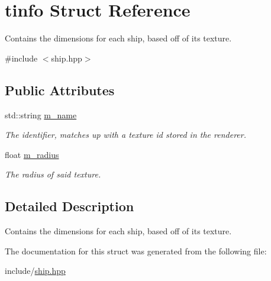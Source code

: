 \hypertarget{structtinfo}{\section{tinfo Struct Reference}
\label{structtinfo}
}


Contains the dimensions for each ship, based off of its texture.  




{\ttfamily \#include $<$ship.\-hpp$>$}

\subsection*{Public Attributes}
\begin{DoxyCompactItemize}
\item 
\hypertarget{structtinfo_a739a47e942419a16cd995d835401c202}{std\-::string \hyperlink{structtinfo_a739a47e942419a16cd995d835401c202}{m\-\_\-name}}\label{structtinfo_a739a47e942419a16cd995d835401c202}

\begin{DoxyCompactList}\small\item\em The identifier, matches up with a texture id stored in the renderer. \end{DoxyCompactList}\item 
\hypertarget{structtinfo_a98fc4ccb9b63c90cc73d4f66ba7868f0}{float \hyperlink{structtinfo_a98fc4ccb9b63c90cc73d4f66ba7868f0}{m\-\_\-radius}}\label{structtinfo_a98fc4ccb9b63c90cc73d4f66ba7868f0}

\begin{DoxyCompactList}\small\item\em The radius of said texture. \end{DoxyCompactList}\end{DoxyCompactItemize}


\subsection{Detailed Description}
Contains the dimensions for each ship, based off of its texture. 

The documentation for this struct was generated from the following file\-:\begin{DoxyCompactItemize}
\item 
include/\hyperlink{ship_8hpp}{ship.\-hpp}\end{DoxyCompactItemize}
